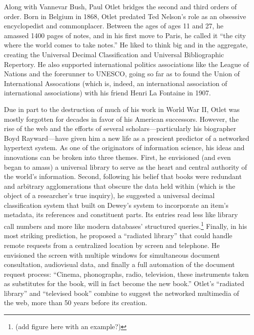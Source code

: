 Along with Vannevar Bush, Paul Otlet bridges the second and third orders of order. Born in Belgium in 1868, Otlet predated Ted Nelson's role as an obsessive encyclopedist and commonplacer. Between the ages of ages 11 and 27, he amassed 1400 pages of notes, and in his first move to Paris, he called it ``the city where the world comes to take notes.''\autocite{_limited_2001}  He liked to think big and in the aggregate, creating the Universal Decimal Classification and Universal Bibliographic Repertory. He also supported international politics associations like the League of Nations and the forerunner to UNESCO, going so far as to found the Union of International Assocations (which is, indeed, an international association of international associations) with his friend Henri La Fontaine in 1907.

Due in part to the destruction of much of his work in World War II, Otlet was mostly forgotten for decades in favor of his American successors. However, the rise of the web and the efforts of several scholars---particularly his biographer Boyd Rayward---have given him a new life as a prescient predictor of a networked hypertext system. As one of the originators of information science, his ideas and innovations can be broken into three themes. First, he envisioned (and even began to amass) a universal library to serve as the heart and central authority of the world's information. Second, following his belief that books were redundant and arbitrary agglomerations that obscure the data held within (which is the object of a researcher's true inquiry), he suggested a universal decimal classification system that built on Dewey's system to incorporate an item's metadata, its references and constituent parts. Its entries read less like library call numbers and more like modern databases' structured queries.\footnote{(add figure here with an example?)} Finally, in his most striking prediction, he proposed a ``radiated library'' that could handle remote requests from a centralized location by screen and telephone. He envisioned the screen with multiple windows for simultaneous document consultation, audiovisual data, and finally a full automation of the document request process: ``Cinema, phonographs, radio, television, these instruments taken as substitutes for the book, will in fact become the new book.''\autocite{van_veelen_alle_1998} Otlet's ``radiated library'' and ``televised book'' combine to suggest the networked multimedia of the web, more than 50 years before its creation.

